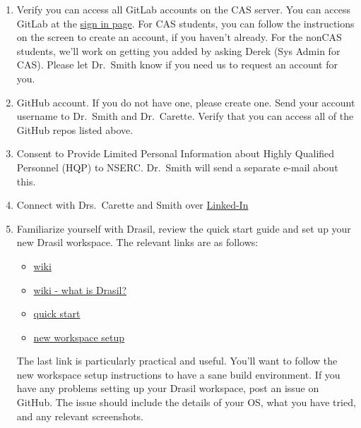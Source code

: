 \documentclass[12pt]{article}
\begin{document}
\begin{enumerate} 
    
\item Verify you can access all GitLab accounts on the CAS server.  You can
access GitLab at the \href{https://gitlab.cas.mcmaster.ca/users/sign_in} {sign
in page}.  For CAS students, you can follow the instructions on the screen to
create an account, if you haven't already.  For the nonCAS students, we'll work
on getting you added by asking Derek (Sys Admin for CAS).  Please let Dr.\ Smith
know if you need us to request an account for you.

\item GitHub account.  If you do not have one, please create one.  Send your
account username to Dr.\ Smith and Dr.\ Carette.  Verify that you can access all
of the GitHub repos listed above.

\item Consent to Provide Limited Personal Information about Highly Qualified
Personnel (HQP) to NSERC.  Dr.\ Smith will send a separate e-mail about this.

\item Connect with Drs.\ Carette and Smith over \href{https://www.linkedin.com/}
{Linked-In}

\item Familiarize yourself with Drasil, review the quick start guide and set up
your new Drasil workspace.  The relevant links are as follows:

\begin{itemize}

\item \href{https://github.com/JacquesCarette/Drasil/wiki} {wiki}

\item \href{https://github.com/JacquesCarette/Drasil/wiki#what-is-drasil-cont}
{wiki - what is Drasil?}

\item \href{https://github.com/JacquesCarette/Drasil#quick-start} {quick start}

\item \href{https://github.com/JacquesCarette/Drasil/wiki/New-Workspace-Setup}
{new workspace setup}

\end{itemize}

The last link is particularly practical and useful.  You'll want to follow the
new workspace setup instructions to have a sane build environment.  If you have
any problems setting up your Drasil workspace, post an issue on GitHub.  The
issue should include the details of your OS, what you have tried, and any
relevant screenshots.


\end{enumerate}
\end{document}
